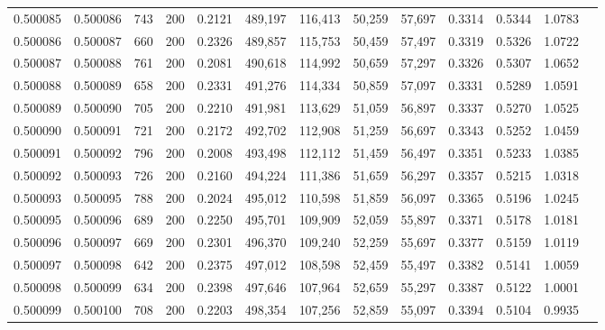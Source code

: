 \begin{tabular}{rrrrrrrrrrrrr}
0.500085 & 0.500086 &    743 & 200 &                                     0.2121 & 489,197 & 116,413 &  50,259 &  57,697 & 0.3314 & 0.5344 & 1.0783 \\
0.500086 & 0.500087 &    660 & 200 &                                     0.2326 & 489,857 & 115,753 &  50,459 &  57,497 & 0.3319 & 0.5326 & 1.0722 \\
0.500087 & 0.500088 &    761 & 200 &                                     0.2081 & 490,618 & 114,992 &  50,659 &  57,297 & 0.3326 & 0.5307 & 1.0652 \\
0.500088 & 0.500089 &    658 & 200 &                                     0.2331 & 491,276 & 114,334 &  50,859 &  57,097 & 0.3331 & 0.5289 & 1.0591 \\
0.500089 & 0.500090 &    705 & 200 &                                     0.2210 & 491,981 & 113,629 &  51,059 &  56,897 & 0.3337 & 0.5270 & 1.0525 \\
0.500090 & 0.500091 &    721 & 200 &                                     0.2172 & 492,702 & 112,908 &  51,259 &  56,697 & 0.3343 & 0.5252 & 1.0459 \\
0.500091 & 0.500092 &    796 & 200 &                                     0.2008 & 493,498 & 112,112 &  51,459 &  56,497 & 0.3351 & 0.5233 & 1.0385 \\
0.500092 & 0.500093 &    726 & 200 &                                     0.2160 & 494,224 & 111,386 &  51,659 &  56,297 & 0.3357 & 0.5215 & 1.0318 \\
0.500093 & 0.500095 &    788 & 200 &                                     0.2024 & 495,012 & 110,598 &  51,859 &  56,097 & 0.3365 & 0.5196 & 1.0245 \\
0.500095 & 0.500096 &    689 & 200 &                                     0.2250 & 495,701 & 109,909 &  52,059 &  55,897 & 0.3371 & 0.5178 & 1.0181 \\
0.500096 & 0.500097 &    669 & 200 &                                     0.2301 & 496,370 & 109,240 &  52,259 &  55,697 & 0.3377 & 0.5159 & 1.0119 \\
0.500097 & 0.500098 &    642 & 200 &                                     0.2375 & 497,012 & 108,598 &  52,459 &  55,497 & 0.3382 & 0.5141 & 1.0059 \\
0.500098 & 0.500099 &    634 & 200 &                                     0.2398 & 497,646 & 107,964 &  52,659 &  55,297 & 0.3387 & 0.5122 & 1.0001 \\
0.500099 & 0.500100 &    708 & 200 &                                     0.2203 & 498,354 & 107,256 &  52,859 &  55,097 & 0.3394 & 0.5104 & 0.9935 \\

\end{tabular}
